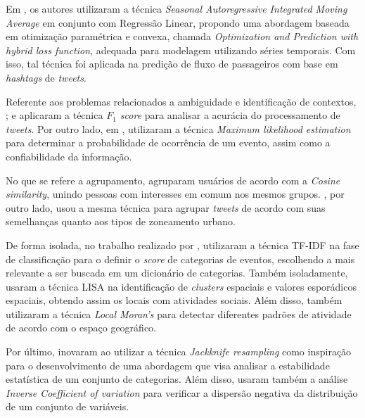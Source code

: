 \documentclass[
	12pt,				%
	oneside,			%
	a4paper,			%
	english,			%
	brazil				%
	]{abntex2ppgsi}
\begin{document}
Em \cite{Ni2016}, os autores utilizaram a técnica \textit{Seasonal Autoregressive Integrated Moving Average} em conjunto com Regressão Linear, propondo uma abordagem baseada em otimização paramétrica e convexa, chamada \textit{Optimization and Prediction with hybrid loss function}, adequada para modelagem utilizando séries temporais. Com isso, tal técnica foi aplicada na predição de fluxo de passageiros com base em \textit{hashtags} de \textit{tweets}.  

Referente aos problemas relacionados a ambiguidade e identificação de contextos, \cite{Anantharam2015}; \cite{Chen2016} e \cite{Gal-Tzur2014} aplicaram a técnica \textit{${F_1}$ score} para analisar a acurácia do processamento de \textit{tweets}. Por outro lado, em \cite{Mukherjee2015}, utilizaram a técnica \textit{Maximum likelihood estimation} para determinar a probabilidade de ocorrência de um evento, assim como a confiabilidade da informação.

No que se refere a agrupamento, \cite{Yousaf2014} agruparam usuários de acordo com a \textit{Cosine similarity}, unindo pessoas com interesses em comum nos mesmos grupos. \cite{Frias-Martinez2014}, por outro lado, usou a mesma técnica para agrupar \textit{tweets} de acordo com suas semelhanças quanto aos tipos de zoneamento urbano.

De forma isolada, no trabalho realizado por \cite{Mukherjee2015}, utilizaram a técnica TF-IDF na fase de classificação para o definir o \textit{score} de categorias de eventos, escolhendo a mais relevante a ser buscada em um dicionário de categorias. Também isoladamente, \cite{Steiger2015Census} usaram a técnica LISA na identificação de \textit{clusters} espaciais e valores esporádicos espaciais, obtendo assim os locais com atividades sociais. Além disso, também utilizaram a técnica \textit{Local Moran's} para detectar diferentes padrões de atividade de acordo com o espaço geográfico.

Por último, \cite{Bendler2014} inovaram ao utilizar a técnica \textit{Jackknife resampling} como inspiração para o desenvolvimento de uma abordagem que visa analisar a estabilidade estatística de um conjunto de categorias. Além disso, usaram também a análise \textit{Inverse Coefficient of variation} para verificar a dispersão negativa da distribuição de um conjunto de variáveis. 
\end{document}
